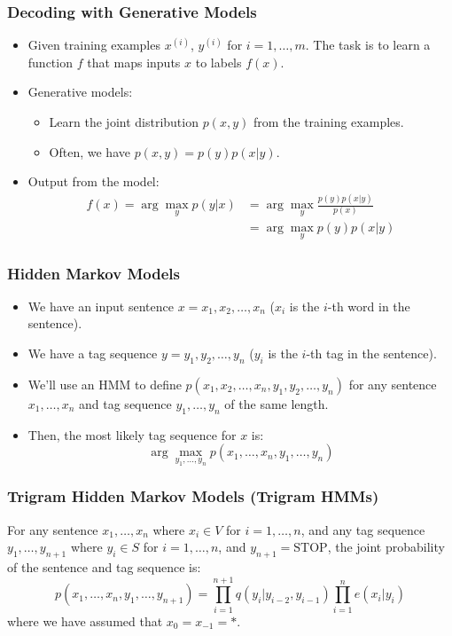 \documentclass[handout]{beamer}
\begin{document}
\begin{frame}
  \frametitle{Decoding with Generative Models}
  \begin{itemize}
    \item Given training examples $x^{(i)}$, $y^{(i)}$ for $i = 1, \ldots, m$. The task is to learn a function $f$ that maps inputs $x$ to labels $f(x)$.
    \item Generative models:
    \begin{itemize}
      \item Learn the joint distribution $p(x, y)$ from the training examples.
      \item Often, we have $p(x, y) = p(y)p(x|y)$.
    \end{itemize}
    \item Output from the model:
\[
\begin{aligned}
f(x) = \arg\max_y p(y|x) &= \arg\max_y \frac{p(y)p(x|y)}{p(x)} \\
&= \arg\max_y p(y)p(x|y)
\end{aligned}
\]
  \end{itemize}
\end{frame}

\begin{frame}
  \frametitle{Hidden Markov Models}
  \begin{itemize}
    \item We have an input sentence $x = x_1, x_2, \ldots, x_n$ ($x_i$ is the $i$-th word in the sentence).
    \item We have a tag sequence $y = y_1, y_2, \ldots, y_n$ ($y_i$ is the $i$-th tag in the sentence).
    \item We'll use an HMM to define $p(x_1, x_2, \ldots, x_n, y_1, y_2, \ldots, y_n)$ for any sentence $x_1, \ldots, x_n$ and tag sequence $y_1, \ldots, y_n$ of the same length. \cite{kupiec1992robust}
    \item Then, the most likely tag sequence for $x$ is:
    \[
      \arg\max_{y_1,\ldots,y_n} p(x_1, \ldots, x_n, y_1, \ldots, y_n)
    \]
  \end{itemize}
\end{frame}

\begin{frame}
  \frametitle{Trigram Hidden Markov Models (Trigram HMMs)}
  For any sentence $x_1, \ldots, x_n$ where $x_i \in V$ for $i = 1, \ldots, n$, and any tag sequence $y_1, \ldots, y_{n+1}$ where $y_i \in S$ for $i = 1, \ldots, n$, and $y_{n+1} = \text{STOP}$, the joint probability of the sentence and tag sequence is:
  \[
    p(x_1, \ldots, x_n, y_1, \ldots, y_{n+1}) = \prod_{i=1}^{n+1} q(y_i | y_{i-2}, y_{i-1}) \prod_{i=1}^{n} e(x_i | y_i)
  \]
  where we have assumed that $x_0 = x_{-1} = *$.
\end{frame}
\end{document}
